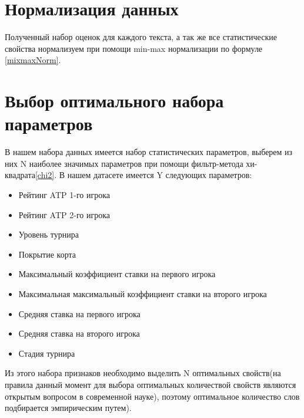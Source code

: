 \section{Нормализация данных}
Полученный набор оценок для каждого текста, а так же все статистические свойства нормализуем при помощи min-max нормализации по формуле \ref{mixmaxNorm}.
\section{Выбор оптимального набора параметров}
В нашем набора данных имеется набор статистических параметров, выберем из них N наиболее значимых параметров при помощи фильтр-метода хи-квадрата\ref{chi2}.
В нашем датасете имеется Y следующих параметров:
\begin{itemize}
	\item Рейтинг ATP 1-го игрока
	\item Рейтинг ATP 2-го игрока
	\item Уровень турнира
	\item Покрытие корта
	\item Максимальный коэффициент ставки на первого игрока
	\item Максимальная максимальный коэффициент ставки на второго игрока
	\item Средняя ставка на первого игрока
	\item Средняя ставка на второго игрока
	\item Стадия турнира
\end{itemize}

Из этого набора признаков необходимо выделить N оптимальных свойств(на правила данный момент для выбора оптимальных количествой свойств являются открытым вопросом в современной науке\cite{Book32}), поэтому оптимальное количество слов подбирается эмпирическим путем).
